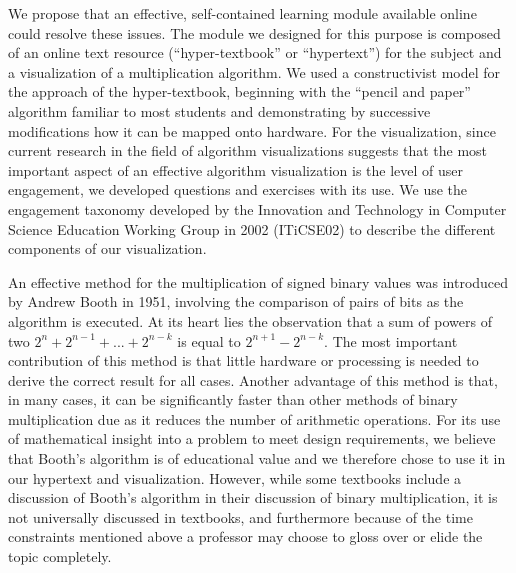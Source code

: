 \documentclass{acm_proc_article-sp}
\begin{document}
We propose that an effective, self-contained learning module available online could resolve these issues.
The module we designed for this purpose is composed of an online text resource (``hyper-textbook'' or ``hypertext'') for the subject and a visualization of a multiplication algorithm.
We used a constructivist model for the approach of the hyper-textbook, beginning with the ``pencil and paper'' algorithm familiar to most students and demonstrating by successive modifications how it can be mapped onto hardware.
For the visualization, since current research in the field of algorithm visualizations suggests that the most important aspect of an effective algorithm visualization is the level of user engagement\cite{tnaps:visengage}, we developed questions and exercises with its use.
We use the engagement taxonomy developed by the Innovation and Technology in Computer Science Education Working Group in 2002 (ITiCSE02) to describe the different components of our visualization.

An effective method for the multiplication of signed binary values was introduced by Andrew Booth in 1951, involving the comparison of pairs of bits as the algorithm is executed.
At its heart lies the observation that a sum of powers of two $2^n + 2^{n-1} + ...
+ 2^{n-k}$ is equal to $2^{n+1} - 2^{n-k}$.
The most important contribution of this method is that little hardware or processing is needed to derive the correct result for all cases\cite{booth}.
Another advantage of this method is that, in many cases, it can be significantly faster than other methods of binary multiplication due as it reduces the number of arithmetic operations.\cite{text1}
For its use of mathematical insight into a problem to meet design requirements, we believe that Booth's algorithm is of educational value and we therefore chose to use it in our hypertext and visualization.
However, while some textbooks include a discussion of Booth's algorithm in their discussion of binary multiplication, it is not universally discussed in textbooks, and furthermore because of the time constraints mentioned above a professor may choose to gloss over or elide the topic completely.
\end{document}
